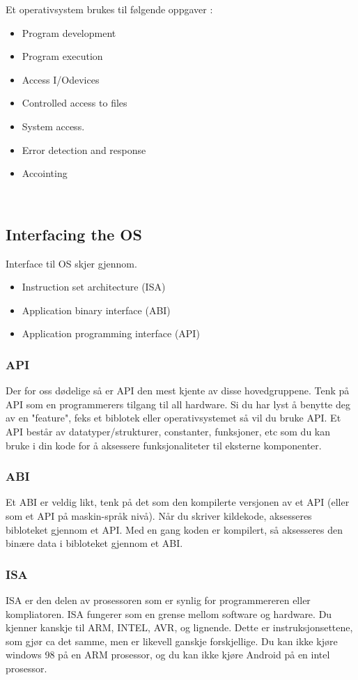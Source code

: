 Et operativsystem brukes til følgende oppgaver :
\begin{itemize}
\item Program development
\item Program execution
\item Access I/Odevices
\item Controlled access to files
\item System access.
\item Error detection and response
\item Accointing
\end{itemize}
~\\
\subsection{Interfacing the OS}
Interface til OS skjer gjennom.
\begin{itemize}
\item Instruction set architecture (ISA)
\item Application binary interface (ABI)
\item Application programming interface (API)
\end{itemize}
\subsubsection{API}
Der for oss dødelige så er API den mest kjente av disse hovedgruppene. 
Tenk på API som en programmerers tilgang til all hardware. Si du har lyst å benytte deg av en "feature", feks et biblotek eller operativsystemet så vil du bruke API. Et API består av datatyper/strukturer, constanter, funksjoner, etc som du kan bruke i din kode for å aksessere funksjonaliteter til eksterne komponenter.
\subsubsection{ABI}
Et ABI er veldig likt, tenk på det som den kompilerte versjonen av et API (eller som et API på maskin-språk nivå). Når du skriver kildekode, aksesseres bibloteket gjennom et API. Med en gang koden er kompilert, så aksesseres den binære data i bibloteket gjennom et ABI.
\subsubsection{ISA}
ISA er den delen av prosessoren som er synlig for programmereren eller kompliatoren. ISA fungerer som en grense mellom software og hardware. Du kjenner kanskje til ARM, INTEL, AVR, og lignende. Dette er instruksjonsettene, som gjør ca det samme, men er likevell ganskje forskjellige. Du kan ikke kjøre windows 98 på en ARM prosessor, og du kan ikke kjøre Android på en intel prosessor.

